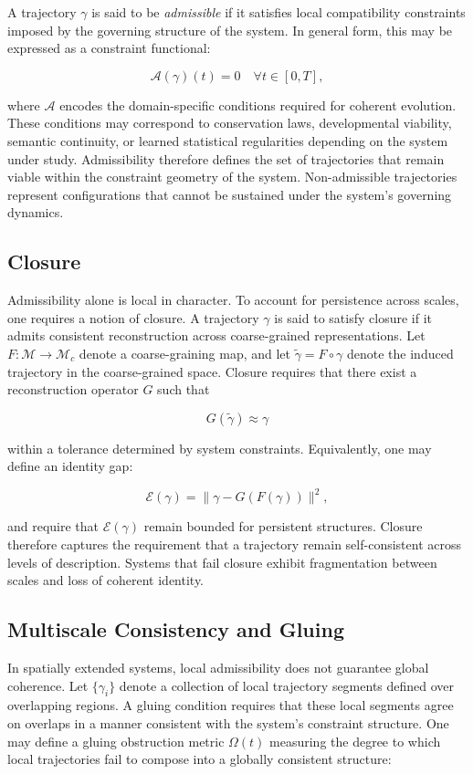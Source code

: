 \documentclass[12pt,a4paper]{article}
\begin{document}
A trajectory $\gamma$ is said to be \emph{admissible} if it satisfies local
compatibility constraints imposed by the governing structure of the system. In general
form, this may be expressed as a constraint functional:

\[
\mathcal{A}(\gamma)(t) = 0 \quad \forall t \in [0,T],
\]

where $\mathcal{A}$ encodes the domain-specific conditions required for coherent
evolution. These conditions may correspond to conservation laws, developmental
viability, semantic continuity, or learned statistical regularities depending on the
system under study. Admissibility therefore defines the set of trajectories that
remain viable within the constraint geometry of the system. Non-admissible trajectories
represent configurations that cannot be sustained under the system's governing dynamics.

\subsection{Closure}

Admissibility alone is local in character. To account for persistence across scales,
one requires a notion of closure. A trajectory $\gamma$ is said to satisfy closure
if it admits consistent reconstruction across coarse-grained representations. Let
$F : \mathcal{M} \to \mathcal{M}_c$ denote a coarse-graining map, and let
$\tilde{\gamma} = F \circ \gamma$ denote the induced trajectory in the coarse-grained
space. Closure requires that there exist a reconstruction operator $G$ such that

\[
G(\tilde{\gamma}) \approx \gamma
\]

within a tolerance determined by system constraints. Equivalently, one may define an
identity gap:

\[
\mathcal{E}(\gamma) = \|\gamma - G(F(\gamma))\|^2,
\]

and require that $\mathcal{E}(\gamma)$ remain bounded for persistent structures.
Closure therefore captures the requirement that a trajectory remain self-consistent
across levels of description. Systems that fail closure exhibit fragmentation between
scales and loss of coherent identity.

\subsection{Multiscale Consistency and Gluing}

In spatially extended systems, local admissibility does not guarantee global coherence.
Let $\{\gamma_i\}$ denote a collection of local trajectory segments defined over
overlapping regions. A gluing condition requires that these local segments agree on
overlaps in a manner consistent with the system's constraint structure. One may define
a gluing obstruction metric $\Omega(t)$ measuring the degree to which local
trajectories fail to compose into a globally consistent structure:
\end{document}

